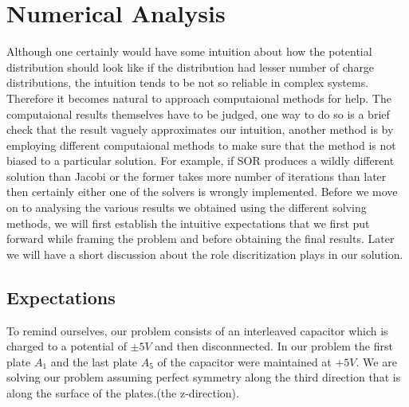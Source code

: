 \section{Numerical Analysis}
Although one certainly would have some intuition about how the potential distribution should look like if the distribution had lesser number of charge distributions, the intuition tends to be not so reliable in complex systems. Therefore it becomes natural to approach computaional methods for help. The computaional results themselves have to be judged, one way to do so is a brief check that the result vaguely approximates our intuition, another method is by employing different computaional methods to make sure that the method is not biased to a particular solution. For example, if SOR produces a wildly different solution than Jacobi or the former takes more number of iterations than later then certainly either one of the solvers is wrongly implemented. Before we move on to analysing the various results we obtained using the different solving methods, we will first establish the intuitive expectations that we first put forward while framing the problem and before obtaining the final results. Later we will have a short discussion about the role discritization plays in our solution.

\subsection{Expectations}

To remind ourselves, our problem consists of an interleaved capacitor which is charged to a potential of $\pm5 V$ and then disconnnected. In our problem the first plate $A_{1}$ and the last plate $A_5$ of the capacitor were maintained at $+5V$. We are solving our problem assuming perfect symmetry along the third direction that is along the surface of the plates.(the z-direction).

